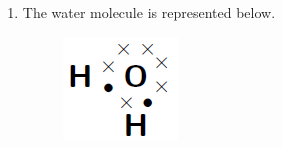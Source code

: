 {\begin{mdframed}[linewidth=4, leftmargin=40, rightmargin=40]
\begin{exercise}
\begin{enumerate}[noitemsep, label=\textbf{Step} \textbf{\arabic*}. ]
\begin{figure}[H]
\begin{center}
      \vspace{2pt}
    \vspace{.1in}
    
    \end{center}

 \end{figure}   

    \addtocounter{footnote}{-0}
    
      \item  
      \label{m38701*id140318}The water molecule is represented below.\par 
      
    \setcounter{subfigure}{0}


	\begin{figure}[H] %
    \begin{center}
    \label{m38701*uid16!!!underscore!!!media}\label{m38701*uid16!!!underscore!!!printimage}\includegraphics{col11305.imgs/m38701_CG11C1_010.png} %
        
      \vspace{2pt}
    \vspace{.1in}
    
    \end{center}

 \end{figure}   

    \addtocounter{footnote}{-0}
    
      
      \end{enumerate}
         

    \end{exercise}
    \end{mdframed}
    }
    \noindent
  
\label{m38701*secfhsst!!!underscore!!!id245}\vspace{.5cm} 
      
